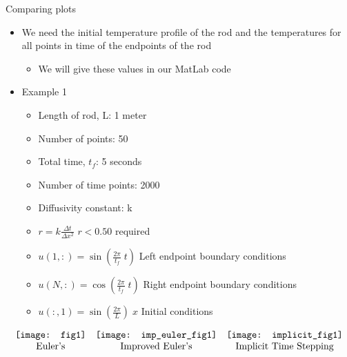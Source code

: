 \documentclass[compress]{beamer}
\begin{document}
\begin{frame}
\begin{center}
Comparing plots
\end{center}
\begin{itemize}
\item We need the initial temperature profile of the rod and the temperatures for all points in time of the endpoints of the rod
\begin{itemize}
\item We will give these values in our MatLab code
\end{itemize}
\item Example 1
\begin{itemize}
\item Length of rod, L:		1 meter 
\item Number of points:		50 
\item Total time, $t_f$:	5 seconds 
\item Number of time points:	2000 
\item Diffusivity constant:		k
\item $r=k\frac{\Delta t}{\Delta x^2}$ \hspace{.5in}$r<0.50$ required
\item $u(1,:)=\sin \left(\frac{2\pi}{t_f}\;t\right)$ \hspace{.5in} Left endpoint boundary conditions
\item $u(N,:)=\cos \left(\frac{2\pi}{t_f}\;t\right)$ \hspace{.5in}Right endpoint boundary conditions
\item $u(:,1)=\sin \left(\frac{2\pi}{L}\right)\;x$ \hspace{.5in}Initial conditions
\end{itemize}
\end{itemize}
\end{frame}

\begin{frame}
\[
\begin{array}{c c c}
\texttt{[image: fig1]} 	&	\texttt{[image: imp\_euler\_fig1]}		&	\texttt{[image: implicit\_fig1]}	\\
\text{Euler's} 						&	\text{Improved Euler's}									&	\text{Implicit Time Stepping}  
\end{array}	
\]
\end{frame}
\end{document}
